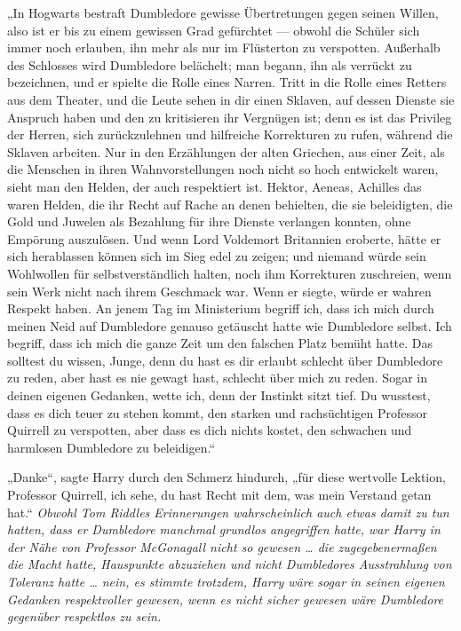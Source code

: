 „In Hogwarts bestraft Dumbledore gewisse Übertretungen gegen seinen Willen, also ist er bis zu einem gewissen Grad gefürchtet — obwohl die Schüler sich immer noch erlauben, ihn mehr als nur im Flüsterton zu verspotten. Außerhalb des Schlosses wird Dumbledore belächelt; man begann, ihn als verrückt zu bezeichnen, und er spielte die Rolle eines Narren. Tritt in die Rolle eines Retters aus dem Theater, und die Leute sehen in dir einen Sklaven, auf dessen Dienste sie Anspruch haben und den zu kritisieren ihr Vergnügen ist; denn es ist das Privileg der Herren, sich zurückzulehnen und hilfreiche Korrekturen zu rufen, während die Sklaven arbeiten. Nur in den Erzählungen der alten Griechen, aus einer Zeit, als die Menschen in ihren Wahnvorstellungen noch nicht so hoch entwickelt waren, sieht man den Helden, der auch respektiert ist. Hektor, Aeneas, Achilles das waren Helden, die ihr Recht auf Rache an denen behielten, die sie beleidigten, die Gold und Juwelen als Bezahlung für ihre Dienste verlangen konnten, ohne Empörung auszulösen. Und wenn Lord Voldemort Britannien eroberte, hätte er sich herablassen können sich im Sieg edel zu zeigen; und niemand würde sein Wohlwollen für selbstverständlich halten, noch ihm Korrekturen zuschreien, wenn sein Werk nicht nach ihrem Geschmack war. Wenn er siegte, würde er wahren Respekt haben. An jenem Tag im Ministerium begriff ich, dass ich mich durch meinen Neid auf Dumbledore genauso getäuscht hatte wie Dumbledore selbst. Ich begriff, dass ich mich die ganze Zeit um den falschen Platz bemüht hatte. Das solltest du wissen, Junge, denn du hast es dir erlaubt schlecht über Dumbledore zu reden, aber hast es nie gewagt hast, schlecht über mich zu reden. Sogar in deinen eigenen Gedanken, wette ich, denn der Instinkt sitzt tief. Du wusstest, dass es dich teuer zu stehen kommt, den starken und rachsüchtigen Professor Quirrell zu verspotten, aber dass es dich nichts kostet, den schwachen und harmlosen Dumbledore zu beleidigen.“

„Danke“, sagte Harry durch den Schmerz hindurch, „für diese wertvolle Lektion, Professor Quirrell, ich sehe, du hast Recht mit dem, was mein Verstand getan hat.“
\emph{Obwohl Tom Riddles Erinnerungen wahrscheinlich auch etwas damit zu tun hatten, dass er Dumbledore manchmal grundlos angegriffen hatte, war Harry in der Nähe von Professor McGonagall nicht so gewesen … die zugegebenermaßen die Macht hatte, Hauspunkte abzuziehen und nicht Dumbledores Ausstrahlung von Toleranz hatte … nein, es stimmte trotzdem, Harry wäre sogar in seinen eigenen Gedanken respektvoller gewesen, wenn es nicht \emph{sicher} gewesen wäre Dumbledore gegenüber respektlos zu sein.}

